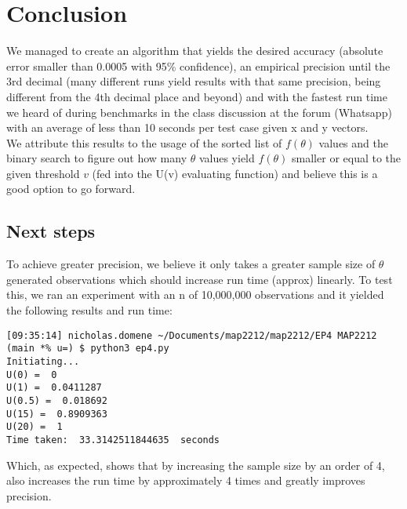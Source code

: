 \documentclass[12pt]{article}
\begin{document}
\section*{Conclusion}
We managed to create an algorithm that yields the desired accuracy (absolute error smaller than 0.0005 with 95\% confidence), an empirical precision until the 3rd decimal (many different runs yield results with that same precision, being different from the 4th decimal place and beyond) and with the fastest run time we heard of during benchmarks in the class discussion at the forum (Whatsapp) with an average of less than 10 seconds per test case given x and y vectors. \\
We attribute this results to the usage of the sorted list of $f(\theta)$ values and the binary search to figure out how many $\theta$ values yield $f(\theta)$ smaller or equal to the given threshold $v$ (fed into the U(v) evaluating function) and believe this is a good option to go forward.
\subsection*{Next steps}
To achieve greater precision, we believe it only takes a greater sample size of $\theta$ generated observations which should increase run time (approx) linearly. To test this, we ran an experiment with an n of 10,000,000 observations and it yielded the following results and run time:

\begin{lstlisting}
[09:35:14] nicholas.domene ~/Documents/map2212/map2212/EP4 MAP2212 (main *% u=) $ python3 ep4.py 
Initiating...
U(0) =  0
U(1) =  0.0411287
U(0.5) =  0.018692
U(15) =  0.8909363
U(20) =  1
Time taken:  33.3142511844635  seconds
\end{lstlisting}

Which, as expected, shows that by increasing the sample size by an order of 4, also increases the run time by approximately 4 times and greatly improves precision.
\end{document}
